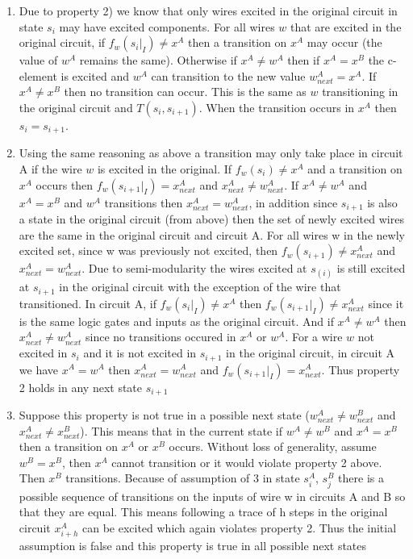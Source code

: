 \documentclass{article}
\begin{document}
\begin{enumerate} %
\item  Due to property 2) we know that only wires excited in the original circuit in state $s_i$ may have excited components.  For all wires $w$ that are excited in the original circuit, if $f_w(s_i|_I)\neq x^A$ then a transition on $x^A$ may occur (the value of $w^A$ remains the same).  Otherwise if $x^A \neq w^A$ then if $x^A = x^B$ the c-element is excited and $w^A$ can transition to the new value $w_{next}^A=x^A$.  If $x^A \neq x^B$ then no transition can occur. This is the same as $w$ transitioning in the original circuit and $T(s_i, s_{i+1})$.  When the transition occurs in $x^A$ then $s_i=s_{i+1}$. 
\item  Using the same reasoning as above a transition may only take place in circuit A if the wire $w$ is excited in the original.   If $f_w(s_i)\neq x^A$ and a transition on $x^A$ occurs then $f_w(s_{i+1}|_I)= x_{next}^A$ and $x_{next}^A\neq w_{next}^A$.  
If $x^A \neq w^A$ and $x^A = x^B$ and $w^A$ transitions then  $x_{next}^A= w_{next}^A$, in addition since $s_{i+1}$ is also a state in the original circuit (from above) then the set of newly excited wires are the same in the original circuit and circuit A.  
For all wires w in the newly excited set, since w was previously not excited, then $f_w(s_{i+1})\neq x_{next}^A$ and $x_{next}^A= w_{next}^A$.  Due to semi-modularity the wires excited at $s_(i)$ is still excited at $s_{i+1}$ in the original circuit with the exception of the wire that transitioned.  In circuit A, if $f_w(s_i|_I)\neq x^A$ then $f_w(s_{i+1}|_I)\neq x_{next}^A$ since it is the same logic gates and inputs as the original circuit.  And if $x^A \neq w^A$ then $x_{next}^A \neq w_{next}^A$ since no transitions occured in $x^A$ or $w^A$. %
For a wire $w$ not excited in $s_i$ and it is not excited in $s_{i+1}$ in the original circuit, in circuit A we have $x^A=w^A$ then $x_{next}^A=w_{next}^A$ and $f_w(s_{i+1}|_I)= x_{next}^A$.  Thus property 2 holds in any next state $s_{i+1}$
\item  Suppose this property is not true in a possible next state ($w_{next}^A\neq w_{next}^B$ and $x_{next}^A\neq x_{next}^B$).  This means that in the current state if $w^A \neq w^B$ and $x^A=x^B$ then a transition on $x^A$ or $x^B$ occurs.  Without loss of generality, assume $w^B=x^B$, then $x^A$ cannot transition or it would violate property 2 above.  Then $x^B$ transitions.  Because of assumption of 3 in state $s_i^A$, $s_j^B$ there is a possible sequence of transitions on the inputs of wire w in circuits A and B so that they are equal.  This means following a trace of h steps in the original circuit  $x_{i+h}^A$ can be excited which again violates property 2.  Thus the initial assumption is false and this property is true in all possible next states 
\end{enumerate}
\end{document}

